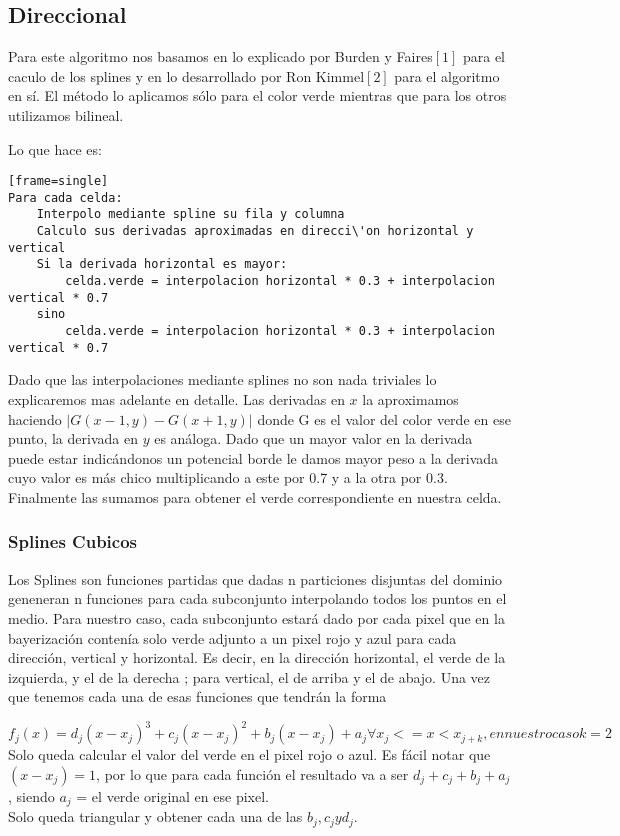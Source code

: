 \subsection{Direccional}

Para este algoritmo nos basamos en lo explicado por Burden y Faires$[1]$ para el caculo de los splines y en lo desarrollado por Ron Kimmel$[2]$ para el algoritmo en sí. El método lo aplicamos sólo para el color verde mientras que para los otros utilizamos bilineal. 

Lo que hace es:
\begin{verbatim}[frame=single] 
Para cada celda:
	Interpolo mediante spline su fila y columna
	Calculo sus derivadas aproximadas en direcci\'on horizontal y vertical
	Si la derivada horizontal es mayor:
		celda.verde = interpolacion horizontal * 0.3 + interpolacion vertical * 0.7
	sino
		celda.verde = interpolacion horizontal * 0.3 + interpolacion vertical * 0.7
\end{verbatim}

Dado que las interpolaciones mediante splines no son nada triviales lo explicaremos mas adelante en detalle. Las derivadas en $x$  la aproximamos haciendo $|G(x-1,y)-G(x+1,y)|$ donde G es el valor del color verde en ese punto, la derivada en $y$ es análoga. Dado que un mayor valor en la derivada puede estar indicándonos un potencial borde le damos mayor peso a la derivada cuyo valor es más chico multiplicando a este por 0.7 y a la otra por 0.3. Finalmente las sumamos para obtener el verde correspondiente en nuestra celda.

\subsubsection{Splines Cubicos}
Los Splines son funciones partidas que dadas n particiones disjuntas del dominio geneneran n funciones para cada subconjunto interpolando todos los puntos en el medio. Para nuestro caso, cada subconjunto estará dado por cada pixel que en la bayerización contenía solo verde adjunto a un pixel rojo y azul para cada dirección, vertical y horizontal. Es decir, en la dirección horizontal, el verde de la izquierda, y el de la derecha ; para vertical, el de arriba y el de abajo. 
Una vez que tenemos cada una de esas funciones que tendrán la forma

$f_j(x) = d_j(x-x_j)^3 + c_j(x-x_j)^2 + b_j(x-x_j) + a_j \forall x_j <= x < x_{j+k}, en nuestro caso k = 2$ \\

Solo queda calcular el valor del verde en el pixel rojo o azul.
Es fácil notar que $(x-x_j) = 1$, por lo que para cada función el resultado va a ser $d_j+c_j+b_j+a_j$, siendo $a_j$ = el verde original en ese pixel.\\
Solo queda triangular y obtener cada una de las $b_j,c_j y d_j$.


